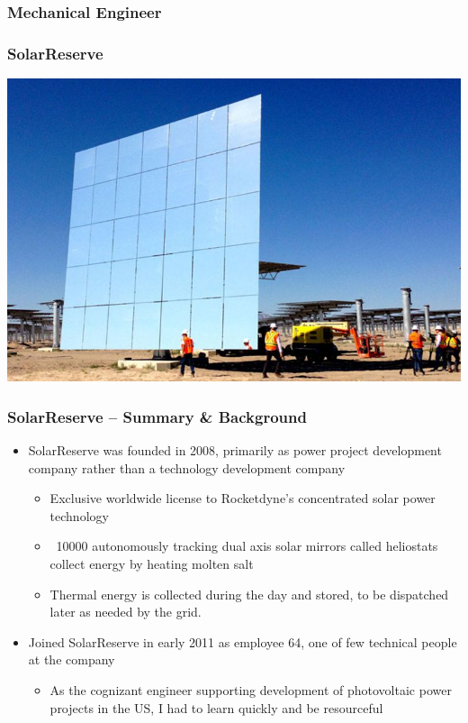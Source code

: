 \documentclass[aspectratio=169]{beamer}
\begin{document}
\subsubsection{Mechanical Engineer}

\begin{frame}
  \frametitle{SolarReserve}
  \center
  \includegraphics[width=.7\linewidth]{HeliostatImage.jpeg}
\end{frame}

\begin{frame}
  \frametitle{SolarReserve -- Summary \& Background}
  \begin{itemize}
  \item SolarReserve was founded in 2008, primarily as power project
    development company rather than a technology development company
    \begin{itemize}
    \item Exclusive worldwide license to Rocketdyne's concentrated
      solar power technology
    \item ~10000 autonomously tracking dual axis solar
      mirrors called heliostats collect energy by heating molten
      salt
    \item Thermal energy is collected during the day and stored, to
      be dispatched later as needed by the grid.
    \end{itemize}
  \item Joined SolarReserve in early 2011 as employee 64, one
    of few technical people at the company
    \begin{itemize}
    \item As the cognizant engineer supporting development of
      photovoltaic power projects in the US, I had to learn quickly
      and be resourceful %
    \end{itemize}
  \end{itemize}
\end{frame}
\end{document}
